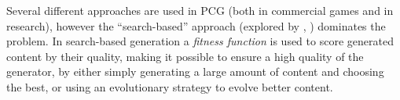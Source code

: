 \documentclass[a4paper,titlepage,final]{report}
\begin{document}
Several different approaches are used in PCG (both in commercial games and in research), however the ``search-based'' approach (explored by \citet{togelius11search}, \citet{pcgbook:ch2}) dominates the problem.
In search-based generation a \textit{fitness function} is used to score generated content by their quality, making it possible to ensure a high quality of the generator, by either simply generating a large amount of content and choosing the best, or using an evolutionary strategy to evolve better content.







\end{document}
